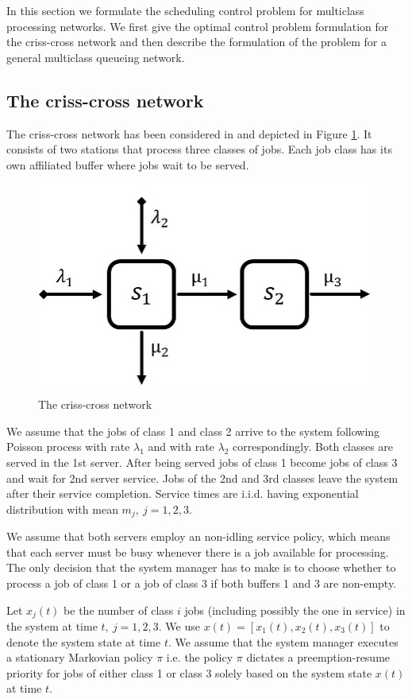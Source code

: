 \documentclass[11pt]{article}
\theoremstyle{definition}
\numberwithin{equation}{section}
\begin{document}
In this section we formulate the scheduling control problem for multiclass processing networks. We first give the optimal control problem formulation for the criss-cross network  and then describe the
formulation of the problem for a general multiclass queueing network.


\subsection{The criss-cross network}
The criss-cross network has been considered in \cite{Harrison1990} and depicted in Figure  \ref{fig:cc}. It consists of two stations that process three classes of jobs. Each job class  has its own affiliated buffer where jobs wait to be served.

\begin{figure}[h]
\centering%
\includegraphics[width=.6\linewidth]{Paper_criss_cross.JPG}
\caption[]{The criss-cross network}
\label{fig:cc}%
\end{figure}

 We assume that the jobs of class 1 and class 2 arrive to the system following Poisson process with rate $\lambda_1$ and with rate $\lambda_2$ correspondingly. Both classes are served in the 1st server. After being served jobs of class 1 become jobs of class 3 and wait for 2nd server service. Jobs of the 2nd and 3rd classes leave the system after their service completion.
Service times are i.i.d. having exponential distribution with mean $m_j,~ j = 1, 2, 3$.



We assume that both servers employ an non-idling service policy, which means that each
server must be busy whenever there is a job available for processing. The only decision that the system manager has to make is to choose whether to process a job of class 1  or a job of class
3 if both buffers 1 and 3 are non-empty.

Let $x_j(t)$ be the number of class $i$ jobs (including possibly the one in service) in the system  at
time $t,~j = 1, 2, 3$.  We use $x(t) = \left[x_1(t), x_2(t), x_3(t)\right]$ to denote the system state at time $t$. We assume that the system manager executes a stationary Markovian policy $\pi$ i.e. the policy $\pi$ dictates a preemption-resume priority for jobs of either class 1 or class 3 solely based on the system state $x(t)$ at time $t$.
\end{document}

